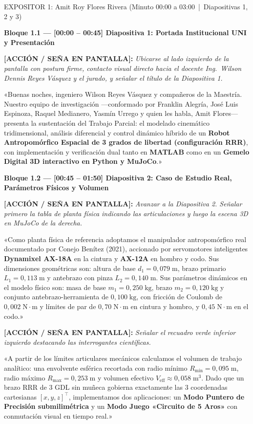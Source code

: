 \documentclass[11pt,a4paper]{article}
\newcommand{\accion}[1]{%
  \par\smallskip\noindent%
  {\color{uniGranate}\textbf{[ACCIÓN / SEÑA EN PANTALLA]:}} {\itshape\color{uniAzul!90!black} #1}\par\smallskip%
}
\newcommand{\speech}[1]{%
  \noindent{\color{verdeOk!85!black}\textbf{[SPEECH]:}} «#1»\par\medskip%
}
\begin{document}
\begin{cajaexpositor}[uniAzul]{EXPOSITOR 1: Amit Roy Flores Rivera (Minuto 00:00 a 03:00 \,|\, Diapositivas 1, 2 y 3)}

\textbf{\color{uniAzul}Bloque 1.1 --- [00:00 -- 00:45] Diapositiva 1: Portada Institucional UNI y Presentación}
\accion{Ubicarse al lado izquierdo de la pantalla con postura firme, contacto visual directo hacia el docente Ing.\ Wilson Dennis Reyes Vásquez y el jurado, y señalar el título de la Diapositiva 1.}
\speech{Buenas noches, ingeniero Wilson Reyes Vásquez y compañeros de la Maestría. Nuestro equipo de investigación —conformado por Franklin Alegría, José Luis Espinoza, Raquel Medianero, Yasmín Urrego y quien les habla, Amit Flores— presenta la sustentación del Trabajo Parcial: el modelado cinemático tridimensional, análisis diferencial y control dinámico híbrido de un \textbf{Robot Antropomórfico Espacial de 3 grados de libertad (configuración RRR)}, con implementación y verificación dual tanto en \textbf{MATLAB} como en un \textbf{Gemelo Digital 3D interactivo en Python y MuJoCo}.}

\textbf{\color{uniAzul}Bloque 1.2 --- [00:45 -- 01:50] Diapositiva 2: Caso de Estudio Real, Parámetros Físicos y Volumen}
\accion{Avanzar a la Diapositiva 2. Señalar primero la tabla de planta física indicando las articulaciones y luego la escena 3D en MuJoCo de la derecha.}
\speech{Como planta física de referencia adoptamos el manipulador antropomórfico real documentado por Conejo Benítez (2021), accionado por servomotores inteligentes \textbf{Dynamixel AX-18A} en la cintura y \textbf{AX-12A} en hombro y codo. Sus dimensiones geométricas son: altura de base $d_1 = 0{,}079\;\text{m}$, brazo primario $L_1 = 0{,}113\;\text{m}$ y antebrazo con pinza $L_2 = 0{,}140\;\text{m}$. Sus parámetros dinámicos en el modelo físico son: masa de base $m_1 = 0{,}250\;\text{kg}$, brazo $m_2 = 0{,}120\;\text{kg}$ y conjunto antebrazo-herramienta de $0{,}100\;\text{kg}$, con fricción de Coulomb de $0{,}002\;\text{N}\cdot\text{m}$ y límites de par de $0{,}70\;\text{N}\cdot\text{m}$ en cintura y hombro, y $0{,}45\;\text{N}\cdot\text{m}$ en el codo.}

\accion{Señalar el recuadro verde inferior izquierdo destacando las interrogantes científicas.}
\speech{A partir de los límites articulares mecánicos calculamos el volumen de trabajo analítico: una envolvente esférica recortada con radio mínimo $R_{\min} = 0{,}095\;\text{m}$, radio máximo $R_{\max} = 0{,}253\;\text{m}$ y volumen efectivo $V_{\text{eff}} \approx 0{,}058\;\text{m}^3$. Dado que un brazo RRR de 3 GDL sin muñeca gobierna exactamente las 3 coordenadas cartesianas $[x, y, z]^\top$, implementamos dos aplicaciones: un \textbf{Modo Puntero de Precisión submilimétrica} y un \textbf{Modo Juego «Circuito de 5 Aros»} con conmutación visual en tiempo real.}


\end{cajaexpositor}
\end{document}
